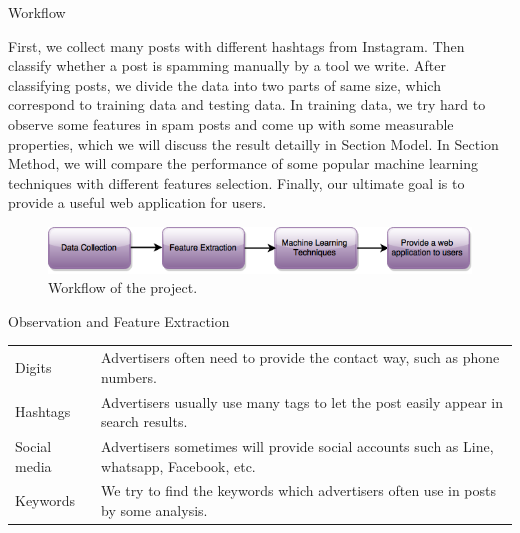 \documentclass[final,hyperref={pdfpagelabels=false}]{beamer}
\begin{document}
\begin{frame}[t]
\begin{columns}[t]
\begin{column}{.465\textwidth}
\begin{block}{Workflow}

First, we collect many posts with different hashtags from Instagram. Then classify whether a post is spamming manually by a tool we write. After classifying posts, we divide the data into two parts of same size, which correspond to training data and testing data. In training data, we try hard to observe some features in spam posts and come up with some measurable properties, which we will discuss the result detailly in Section Model. In Section Method, we will compare the performance of some popular machine learning techniques with different features selection. Finally, our ultimate goal is to provide a useful web application for users. 

\centering
\begin{figure}
\includegraphics[scale=1]{workflow.png}
\caption{Workflow of the project.}
\end{figure}


\end{block}


\begin{block}{Observation and Feature Extraction}



\begin{tabular}{ll}
Digits & Advertisers often need to provide the contact way, such as phone numbers. \\
Hashtags & Advertisers usually use many tags to let the post easily appear in search results. \\
Social media & Advertisers sometimes will provide social accounts such as Line, whatsapp, Facebook, etc. \\
Keywords & We try to find the keywords which advertisers often use in posts by some analysis.


\end{tabular}
\end{block}
\end{column}
\end{columns}
\end{frame}
\end{document}
